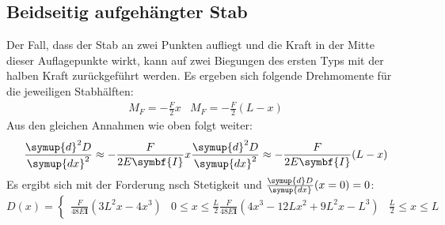 \subsection{Beidseitig aufgehängter Stab}
Der Fall, dass der Stab an zwei Punkten aufliegt und die Kraft in der Mitte dieser 
Auflagepunkte wirkt, kann auf zwei Biegungen des ersten Typs mit der halben Kraft zurückgeführt werden.
Es ergeben sich folgende Drehmomente für die jeweiligen Stabhälften:
\begin{align}
    M_F = -\frac{F}{2}x & 
    M_F = -\frac{F}{2}(L-x)
\end{align}
Aus den gleichen Annahmen wie oben folgt weiter:
\begin{align}
    \frac{\symup{d}^2D}{\symup{dx}^2} \approx -\frac{F}{2E\symbf{I}} x
    \frac{\symup{d}^2D}{\symup{dx}^2} \approx -\frac{F}{2E\symbf{I}} (L-x)
\end{align}
Es ergibt sich mit der Forderung nsch Stetigkeit und \mbox{$\frac{\symup{d}D}{\symup{dx}}(x=0) = 0$}:
\begin{equation}
    D(x) = 
    \begin{cases}
    \frac{F}{48E\symbf{I}}(3L^2x-4x^3) & 0 \leq x \leq \frac{L}{2}
    \frac{F}{48E\symbf{I}}(4x^3-12Lx^2+9L^2x -L^3) & \frac{L}{2} \leq x \leq L
    \end{cases}
\end{equation}
